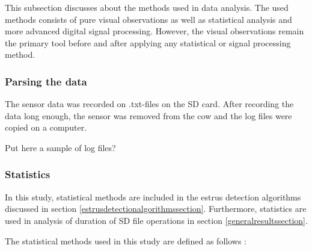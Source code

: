 \documentclass[english,12pt,a4paper,pdftex,elec,utf8]{aaltothesis}
\begin{document}
This subsection discusses about the methods used in data analysis. The used methods consists of pure visual observations as well as statistical analysis and more advanced digital signal processing. However, the visual observations remain the primary tool before and after applying any statistical or signal processing method.

\subsubsection*{Parsing the data}

The sensor data was recorded on .txt-files on the SD card. After recording the data long enough, the sensor was removed from the cow and the log files were copied on a computer. 

Put here a sample of log files?

\subsubsection{Statistics} \label{statisticssection}

In this study, statistical methods are included in the estrus detection algorithms discussed in section \ref{estrusdetectionalgorithmssection}. Furthermore, statistics are used in analysis of duration of SD file operations in section \ref{generalresultssection}.


The statistical methods used in this study are defined as follows \cite{maoltaulukotmatematiikka}:
\end{document}
